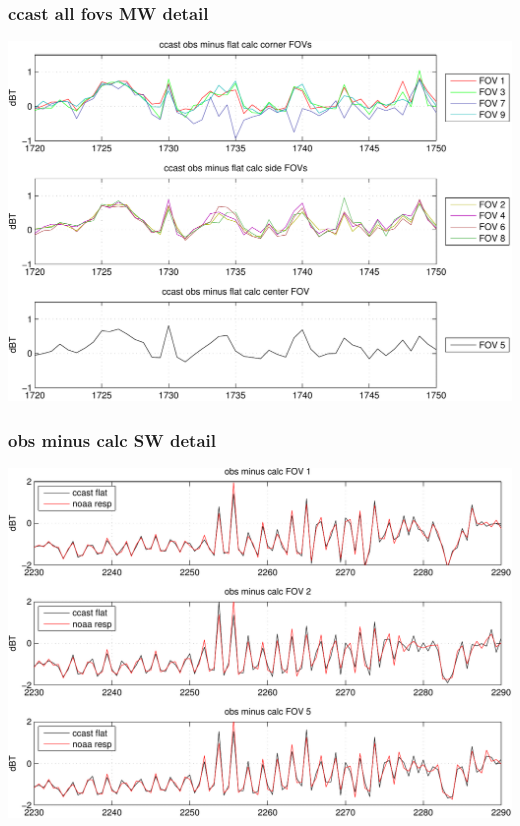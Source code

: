 \documentclass[11pt]{beamer}
\begin{document}
\begin{frame}
\frametitle{ccast all fovs MW detail}
\begin{center}
  \includegraphics[scale=0.5]{figures/cal_ccast_MW.pdf}
\end{center}
\end{frame}
\begin{frame}
\frametitle{obs minus calc SW detail}
\begin{center}
  \includegraphics[scale=0.5]{figures/cal_SW_detail.pdf}
\end{center}
\end{frame}
\end{document}
